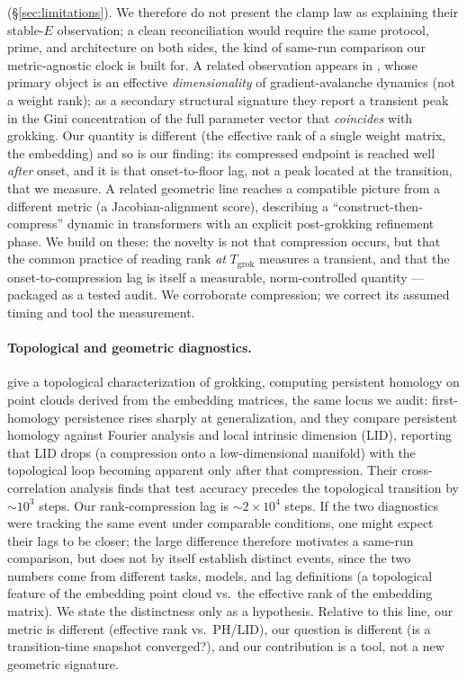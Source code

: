 \documentclass[11pt]{article}
\begin{document}
(\S\ref{sec:limitations}). We therefore do not present the clamp law as explaining their stable-$E$
observation; a clean reconciliation would require the same protocol, prime, and architecture on both
sides, the kind of same-run comparison our metric-agnostic clock is built for. A related observation
appears in
\citet{wang2026dimensional}, whose primary
object is an effective \emph{dimensionality} of gradient-avalanche dynamics (not a weight rank); as a
secondary structural signature they report a transient peak in the Gini concentration of the full
parameter vector that \emph{coincides} with grokking. Our quantity is different (the effective rank of a
single weight matrix, the embedding) and so is our finding: its compressed endpoint is reached well
\emph{after} onset, and it is that onset-to-floor lag, not a peak located at the transition, that we
measure. A related geometric line reaches a compatible picture from a different
metric (a Jacobian-alignment score), describing a ``construct-then-compress'' dynamic in transformers
with an explicit post-grokking refinement phase. We build on these: the novelty is not that compression
occurs, but that the common practice of reading rank \emph{at} $T_{\mathrm{grok}}$ measures a transient,
and that the onset-to-compression lag is itself a measurable, norm-controlled quantity --- packaged as a
tested audit. We corroborate compression; we correct its assumed timing and tool the measurement.

\paragraph{Topological and geometric diagnostics.} \citet{tang2026topological} give a topological
characterization of grokking, computing persistent homology on point clouds derived from the
embedding matrices, the same locus we audit: first-homology persistence rises sharply at
generalization, and they compare persistent homology against Fourier analysis and local intrinsic
dimension (LID), reporting
that LID drops (a compression onto a low-dimensional manifold) with the topological loop becoming
apparent only after that compression. Their cross-correlation analysis finds that test accuracy
precedes the topological transition by $\sim\!10^3$ steps. Our rank-compression lag is
$\sim\!2\times10^4$ steps. If the two diagnostics were tracking the same event under comparable
conditions, one might expect their lags to be closer; the large difference therefore motivates a
same-run comparison, but does not by itself establish distinct events, since the two numbers come from
different tasks, models, and lag definitions (a topological feature of the embedding point cloud vs.\ the
effective rank of the embedding matrix). We state the distinctness only as a hypothesis. Relative
to this line, our metric is different (effective rank vs.\ PH/LID), our question is different
(is a transition-time snapshot converged?), and our contribution is a tool, not a new geometric signature.
\end{document}

